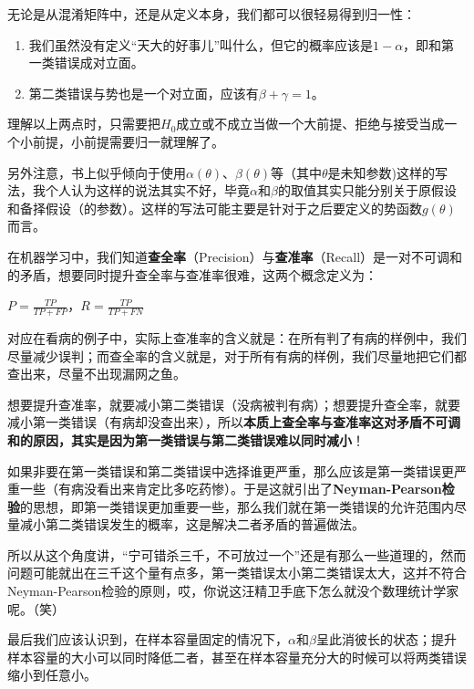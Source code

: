 \documentclass[10pt, a4paper]{article}
\begin{document}
无论是从混淆矩阵中，还是从定义本身，我们都可以很轻易得到归一性：\par
\begin{enumerate}
    \item 我们虽然没有定义“天大的好事儿”叫什么，但它的概率应该是$1-\alpha$，即和第一类错误成对立面。
    \item 第二类错误与势也是一个对立面，应该有$\beta+\gamma=1$。
\end{enumerate}\par
理解以上两点时，只需要把$H_0$成立或不成立当做一个大前提、拒绝与接受当成一个小前提，小前提需要归一就理解了。\par 
另外注意，书上似乎倾向于使用$\alpha(\theta)$、$\beta(\theta)$等（其中$\theta$是未知参数)这样的写法，我个人认为这样的说法其实不好，毕竟$\alpha$和$\beta$的取值其实只能分别关于原假设和备择假设（的参数）。这样的写法可能主要是针对于之后要定义的势函数$g(\theta)$而言。\par
在机器学习中，我们知道\textbf{查全率}（Precision）与\textbf{查准率}（Recall）是一对不可调和的矛盾，想要同时提升查全率与查准率很难，这两个概念定义为：
\begin{center}
    $P=\frac{TP}{TP+FP}$，$R=\frac{TP}{TP+FN}$
\end{center} \par
对应在看病的例子中，实际上查准率的含义就是：在所有判了有病的样例中，我们尽量减少误判；而查全率的含义就是，对于所有有病的样例，我们尽量地把它们都查出来，尽量不出现漏网之鱼。\par
想要提升查准率，就要减小第二类错误（没病被判有病）；想要提升查全率，就要减小第一类错误（有病却没查出来），所以\textbf{本质上查全率与查准率这对矛盾不可调和的原因，其实是因为第一类错误与第二类错误难以同时减小}！\par

如果非要在第一类错误和第二类错误中选择谁更严重，那么应该是第一类错误更严重一些（有病没看出来肯定比多吃药惨）。于是这就引出了\textbf{Neyman-Pearson检验}的思想，即第一类错误更加重要一些，那么我们就在第一类错误的允许范围内尽量减小第二类错误发生的概率，这是解决二者矛盾的普遍做法。\par
所以从这个角度讲，“宁可错杀三千，不可放过一个”还是有那么一些道理的，然而问题可能就出在三千这个量有点多，第一类错误太小第二类错误太大，这并不符合Neyman-Pearson检验的原则，哎，你说这汪精卫手底下怎么就没个数理统计学家呢。（笑）\par

最后我们应该认识到，在样本容量固定的情况下，$\alpha$和$\beta$呈此消彼长的状态；提升样本容量的大小可以同时降低二者，甚至在样本容量充分大的时候可以将两类错误缩小到任意小。
\end{document}
